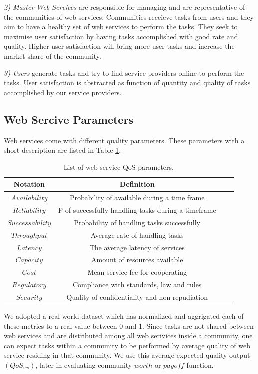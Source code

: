 \documentclass[10pt, conference, compsocconf]{IEEEtran}
\theoremstyle{plain}
\theoremstyle{definition}
\begin{document}
\emph{2) Master Web Services} are responsible for managing and are representative of the communities of web services. Communities receieve tasks from users and they aim to have a healthy set of web services to perform the tasks. They seek to maximise user satisfaction by having tasks accomplished with good rate and quality. Higher user satisfaction will bring more user tasks and increase the market share of the community.

\emph{3) Users} generate tasks and try to find service providers online to perform the tasks. User satisfaction is abstracted as function of quantity and quality of tasks accomplished by our service providers.

\subsection{Web Sercive Parameters}

Web services come with different quality parameters. These parameters with a short description are listed in Table \ref{qosws}.

\begin{table}[!t]
\centering
\caption{List of web service QoS parameters.}
\begin{tabular}{|c|c||c|c|}
\hline
\textbf{Notation} & \textbf{Definition} \\
\hline\hline
$Availability$ & Probability of available during a time frame \\
$Reliability$ & P of successfully handling tasks during a timeframe\\
$Successability$ & Probability of handling tasks successfully \\
$Throughput$ & Average rate of handling tasks \\
$Latency$ & The average latency of services\\
$Capacity$ & Amount of resources available\\
$Cost$ & Mean service fee for cooperating \\
$Regulatory$ & Compliance with standards, law and rules\\
$Security$ & Quality of confidentiality and non-repudiation\\
\hline
\end{tabular}
\label{qosws}
\end{table}

We adopted a real world dataset \cite{DBLP:conf/smc/Al-MasriM09a} which has normalized and aggrigated each of these metrics to a real value between 0 and 1. Since tasks are not shared between web services and are distributed among all web serivices inside a community, one can expect tasks within a community to be performed by average quality of web service residing in that community. We use this average expected quality output $(QoS_{ws})$, later in evaluating community $worth$ or $payoff$ function. 
\end{document}
